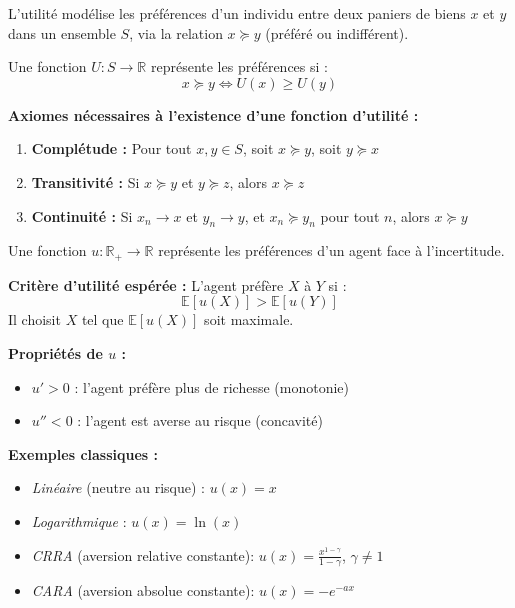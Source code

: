 \begin{f}
	L'utilité modélise les préférences d'un individu entre deux paniers de biens \(x\) et \(y\) dans un ensemble \(S\), via la relation \(x \succcurlyeq y\) (préféré ou indifférent).
	
	Une fonction \(U: S \rightarrow \mathbb{R}\) représente les préférences si :
	\[
	x \succcurlyeq y \iff U(x) \geq U(y)
	\]
	
	\textbf{Axiomes nécessaires à l'existence d'une fonction d'utilité :}
	\begin{enumerate}
		\item \textbf{Complétude :} Pour tout \(x, y \in S\), soit \(x \succcurlyeq y\), soit \(y \succcurlyeq x\)
		\item \textbf{Transitivité :} Si \(x \succcurlyeq y\) et \(y \succcurlyeq z\), alors \(x \succcurlyeq z\)
		\item \textbf{Continuité :} Si \(x_n \to x\) et \(y_n \to y\), et \(x_n \succcurlyeq y_n\) pour tout \(n\), alors \(x \succcurlyeq y\)
	\end{enumerate}
	
\end{f}


\begin{f}
	Une fonction \(u : \mathbb{R}_+ \rightarrow \mathbb{R}\) représente les préférences d'un agent face à l'incertitude.
	
	\textbf{Critère d'utilité espérée :} L’agent préfère \(X\) à \(Y\) si :
	\[
	\mathbb{E}[u(X)] > \mathbb{E}[u(Y)]
	\]
	Il choisit \(X\) tel que \(\mathbb{E}[u(X)]\) soit maximale.
	
	\textbf{Propriétés de \(u\) :}
	\begin{itemize}
		\item \(u'\! > 0\) : l’agent préfère plus de richesse (monotonie)
		\item \(u'' < 0\) : l’agent est averse au risque (concavité)
	\end{itemize}
	
	\textbf{Exemples classiques :}
	\begin{itemize}
		\item \textit{Linéaire} (neutre au risque) : \(u(x) = x\)
		\item \textit{Logarithmique} : \(u(x) = \ln(x)\)
		\item \textit{CRRA}  (aversion relative constante): \(u(x) = \frac{x^{1 - \gamma}}{1 - \gamma}\), \(\gamma \ne 1\)
		\item \textit{CARA}  (aversion absolue constante): \(u(x) = -e^{-a x}\)
	\end{itemize}
	
\end{f}


